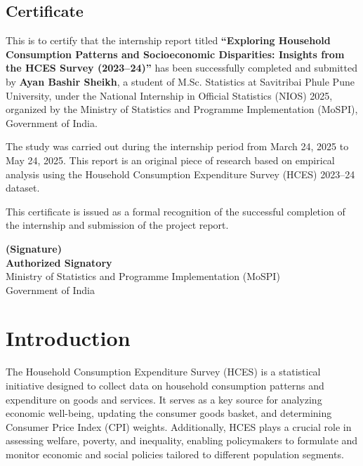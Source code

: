 \documentclass{article}
\begin{document}
\newpage
\begin{center}
	\section*{Certificate}
\end{center}

This is to certify that the internship report titled \textbf{“Exploring Household Consumption Patterns and Socioeconomic Disparities: Insights from the HCES Survey (2023–24)”} has been successfully completed and submitted by \textbf{Ayan Bashir Sheikh}, a student of M.Sc. Statistics at Savitribai Phule Pune University, under the National Internship in Official Statistics (NIOS) 2025, organized by the Ministry of Statistics and Programme Implementation (MoSPI), Government of India.

The study was carried out during the internship period from March 24, 2025 to May 24, 2025. This report is an original piece of research based on empirical analysis using the Household Consumption Expenditure Survey (HCES) 2023–24 dataset.

This certificate is issued as a formal recognition of the successful completion of the internship and submission of the project report.

\bigskip

\begin{flushleft}
	\textbf{(Signature)} \\
	\textbf{Authorized Signatory} \\
	Ministry of Statistics and Programme Implementation (MoSPI) \\
	Government of India
\end{flushleft}


\newpage

	\section{Introduction}
	The Household Consumption Expenditure Survey (HCES) is a statistical initiative designed to collect data on household consumption patterns and expenditure on goods and services. It serves as a key source for analyzing economic well-being, updating the consumer goods basket, and determining Consumer Price Index (CPI) weights. Additionally, HCES plays a crucial role in assessing welfare, poverty, and inequality, enabling policymakers to formulate and monitor economic and social policies tailored to different population segments.
	
\end{document}
